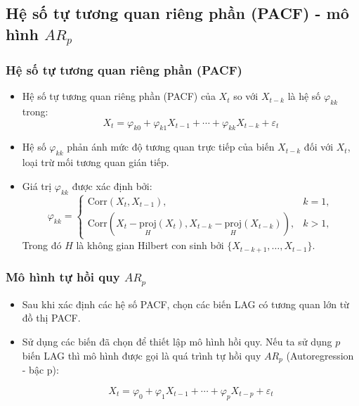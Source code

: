 \subsection{Hệ số tự tương quan riêng phần (PACF) - mô hình  $AR_p$}
\begin{frame}
\frametitle{Hệ số tự tương quan riêng phần (PACF)}
\begin{itemize}
\item Hệ số tự tương quan riêng phần (PACF) của $X_t$ so với $X_{t-k}$ là hệ số $\varphi_{kk}$ trong:
\begin{equation}
X_t = \varphi_{k0} + \varphi_{k1}X_{t-1} + \cdots + \varphi_{kk}X_{t-k} + \varepsilon_t \label{eq:102}
\end{equation}
 \item Hệ số $\varphi_{kk}$ phản ánh mức độ tương quan trực tiếp  của biến $X_{t-k}$ đối với $X_t$, loại trừ mối tương quan gián tiếp.
\item Giá trị $\varphi_{kk}$ được xác định bởi:
\begin{equation}
\varphi_{kk} = \begin{cases}
\mathrm{Corr}(X_t,X_{t-1}), & k=1,\\
\mathrm{Corr}(X_t - \underset{H}{\mathrm{proj}}(X_t), X_{t-k} - \underset{H}{\mathrm{proj}}(X_{t-k})), & k>1,
\end{cases} \label{eq:103}
\end{equation}
Trong đó $H$ là không gian Hilbert con sinh bởi $\{X_{t-k+1},\dots,X_{t-1}\}$.
\end{itemize}
   

\end{frame}
\begin{frame}
\frametitle{Mô hình tự hồi quy $AR_p$}
\begin{itemize}
\item Sau khi xác định các hệ số PACF, chọn các biến LAG có tương quan lớn từ đồ thị PACF.
\item Sử dụng các biến đã chọn để thiết lập mô hình hồi quy.
Nếu ta sử dụng $p$ biến LAG thì mô hình được gọi là quá trình tự hồi quy $AR_p$ (Autoregression - bậc p):

\begin{equation}
X_t = \varphi_0 + \varphi_1X_{t-1} + \cdots + \varphi_pX_{t-p} + \varepsilon_t
\end{equation}
\end{itemize}
\end{frame}
